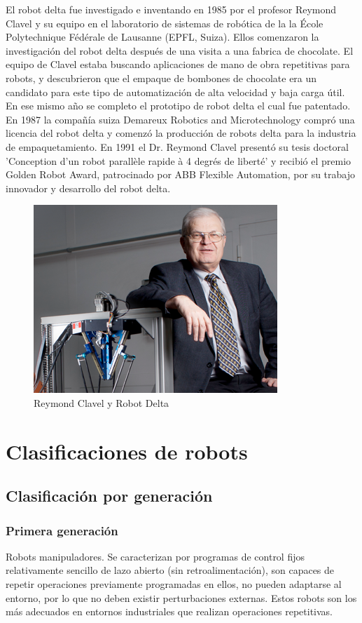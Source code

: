     El robot delta fue investigado e inventando en 1985 por el profesor Reymond Clavel y su equipo en el laboratorio de sistemas de robótica de la la École Polytechnique Fédérale de Lausanne (EPFL, Suiza). Ellos comenzaron la investigación del robot delta después de una visita a una fabrica de chocolate. El equipo de Clavel estaba buscando aplicaciones de mano de obra repetitivas para robots, y descubrieron que el empaque de bombones de chocolate era un candidato para este tipo de automatización de alta velocidad y baja carga útil. En ese mismo año se completo el prototipo de robot delta el cual fue patentado. En 1987 la compañía suiza Demareux Robotics and Microtechnology compró una licencia del robot delta y comenzó la producción de robots delta para la industria de empaquetamiento. En 1991 el Dr. Reymond Clavel presentó su tesis doctoral 'Conception d'un robot parallèle rapide à 4 degrés de liberté' y recibió el premio Golden Robot Award, patrocinado por ABB Flexible Automation, por su trabajo innovador y desarrollo del robot delta.


    \begin{figure}[htb]
        \centering
        \includegraphics[width=0.36\linewidth]{Main/Chapter2/Images2/Reymond-Clavel-Robot-Delta.png}
        \caption{Reymond Clavel y Robot Delta}
        \label{f:Cap2_general_4}
    \end{figure}
    
    
\newpage    
    
\section{Clasificaciones de robots}
    
    \subsection{Clasificación por generación}

        
        \subsubsection{Primera generación}
            Robots manipuladores. Se caracterizan por programas de control fijos relativamente sencillo de lazo abierto (sin retroalimentación), son capaces de repetir operaciones previamente programadas en ellos, no pueden adaptarse al entorno, por lo que no deben existir perturbaciones externas. Estos robots son los más adecuados en entornos industriales que realizan operaciones repetitivas.
        

